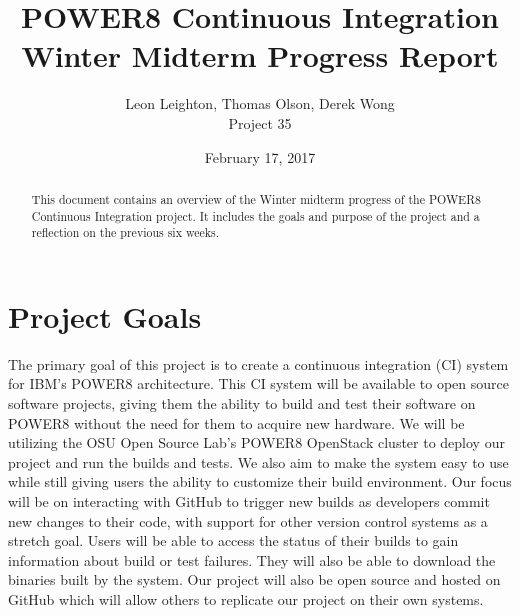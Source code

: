 \documentclass[10pt,onecolumn,journal,draftclsnofoot]{IEEEtran}
\begin{document}
\begin{titlepage}
  \title{POWER8 Continuous Integration\\ Winter Midterm Progress Report}
  \author{Leon Leighton, Thomas Olson, Derek Wong\\Project 35}
  \date{February 17, 2017}
  \maketitle
  \vspace{4cm}
  \begin{abstract}
  \noindent This document contains an overview of the Winter midterm progress of the POWER8 Continuous Integration project.
    It includes the goals and purpose of the project and a reflection on the previous six weeks.
 \end{abstract}
\end{titlepage}

\tableofcontents
\clearpage

\section{Project Goals}
The primary goal of this project is to create a continuous integration (CI) system for IBM's POWER8 architecture.
This CI system will be available to open source software projects, giving them the ability to build and test their software on POWER8 without the need for them to acquire new hardware.
We will be utilizing the OSU Open Source Lab's POWER8 OpenStack cluster to deploy our project and run the builds and tests.
We also aim to make the system easy to use while still giving users the ability to customize their build environment.
Our focus will be on interacting with GitHub to trigger new builds as developers commit new changes to their code, with support for other version control systems as a stretch goal.
Users will be able to access the status of their builds to gain information about build or test failures.
They will also be able to download the binaries built by the system.
Our project will also be open source and hosted on GitHub which will allow others to replicate our project on their own systems.
\end{document}
